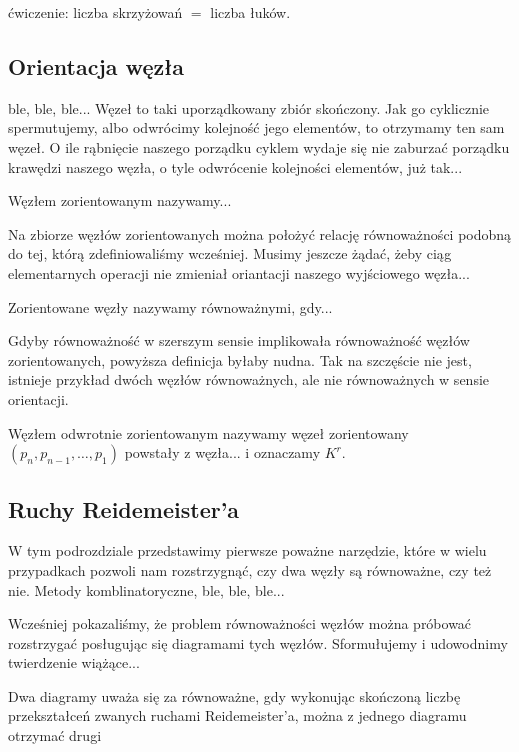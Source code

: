 ćwiczenie: liczba skrzyżowań $=$ liczba łuków.

\subsection{Orientacja węzła}
ble, ble, ble... Węzeł to taki uporządkowany zbiór skończony. Jak go cyklicznie spermutujemy, albo odwrócimy kolejność jego elementów, to otrzymamy ten sam węzeł. O ile rąbnięcie
naszego porządku cyklem wydaje się nie zaburzać porządku krawędzi naszego węzła, o tyle odwrócenie kolejności elementów, już tak...

\begin{definicja}
 Węzłem zorientowanym nazywamy...
\end{definicja}

Na zbiorze węzłów zorientowanych można położyć relację równoważności podobną do tej, którą zdefiniowaliśmy wcześniej. Musimy jeszcze żądać, żeby ciąg elementarnych operacji nie 
zmieniał oriantacji naszego wyjściowego węzła...

\begin{definicja}
 Zorientowane węzły nazywamy równoważnymi, gdy...
\end{definicja}

Gdyby równoważność w szerszym sensie implikowała równoważność węzłów zorientowanych, powyższa definicja byłaby nudna. Tak na szczęście nie jest, istnieje przykład dwóch węzłów
równoważnych, ale nie równoważnych w sensie orientacji.

\begin{definicja}
 Węzłem odwrotnie zorientowanym nazywamy węzeł zorientowany $(p_n, p_{n-1}, \ldots, p_1)$ powstały z węzła... i oznaczamy $K^r$.
\end{definicja}

\subsection{Ruchy Reidemeister'a}
W tym podrozdziale przedstawimy pierwsze poważne narzędzie, które w wielu przypadkach pozwoli nam rozstrzygnąć, czy dwa węzły są równoważne, czy też nie. 
Metody komblinatoryczne, ble, ble, ble...

Wcześniej pokazaliśmy, że problem równoważności węzłów można próbować rozstrzygać posługując się diagramami tych węzłów. Sformułujemy i udowodnimy twierdzenie wiążące...

\begin{definicja}
 Dwa diagramy uważa się za równoważne, gdy wykonując skończoną liczbę przekształceń zwanych ruchami Reidemeister'a, można
 z jednego diagramu otrzymać drugi
\end{definicja}


